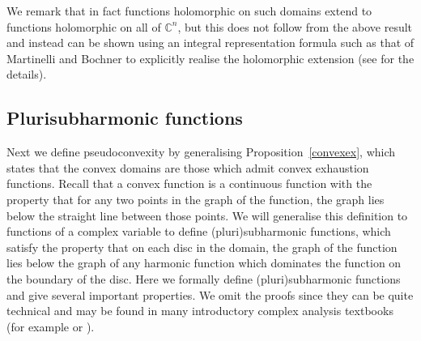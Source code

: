 \documentclass[11pt,a4paper, final, twoside]{article}
\numberwithin{equation}{section}
\newcommand{\C}{\mathbb C}
\begin{document}
We remark that in fact functions holomorphic on such domains extend to functions holomorphic on all of $\C^n$, but this does not follow from the above result and instead can be shown using
an integral representation formula such as that of Martinelli \cite{martinelli} and Bochner \cite{bochner} to explicitly realise the holomorphic extension (see \cite[page 172]{itca}
for the details).

\subsection{Plurisubharmonic functions}
Next we define pseudoconvexity by generalising Proposition~\ref{convexex}, which states that the convex domains are those which admit convex exhaustion functions. Recall that a convex function
is a continuous function with the property that for any two points in the graph of the function, the graph lies below the straight line between those points.
We will generalise this definition to functions of a complex variable to define (pluri)subharmonic functions, which satisfy the property that 
on each disc in the domain, the graph of the function 
lies below the graph of any harmonic function which dominates the function on the boundary of the disc. Here we formally define (pluri)subharmonic functions and give several important properties. 
We omit the proofs since they can be quite technical and may be found
in many introductory complex analysis textbooks (for example \cite[subsection 38]{itca} or \cite[section 10]{vlad}).
\end{document}
